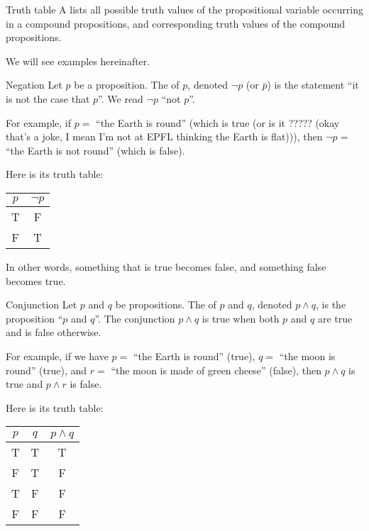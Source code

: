 \documentclass{article}
\begin{document}
\begin{parag}{Truth table}
    A  lists all possible truth values of the propositional variable occurring in a compound propositions, and corresponding truth values of the compound propositions.

    We will see examples hereinafter.
\end{parag}

\begin{parag}{Negation}
    Let $p$ be a proposition. The  of $p$, denoted $\lnot p$ (or $\bar{p}$) is the statement ``it is not the case that $p$''. We read $\lnot p$ ``not $p$''.

    For example, if $p = $ ``the Earth is round'' (which is true (or is it ????? (okay that's a joke, I mean I'm not at EPFL thinking the Earth is flat))), then $\lnot p = $ ``the Earth is not round'' (which is false). 

    Here is its truth table:
    \begin{center}
    \begin{tabular}{c|c}
        $p$ & $\lnot p$  \\
        \hline
        T & F  \\
        F & T
    \end{tabular}
    \end{center}

    In other words, something that is true becomes false, and something false becomes true.
\end{parag}

\begin{parag}{Conjunction}
    Let $p$ and $q$ be propositions. The  of $p$ and $q$, denoted $p \land q$, is the proposition ``$p$ and $q$''. The conjunction $p \land q$ is true when both $p$ and $q$ are true and is false otherwise.

    For example, if we have $p = $ ``the Earth is round'' (true), $q = $ ``the moon is round'' (true), and $r = $ ``the moon is made of green cheese'' (false), then $p \land q$ is true and $p \land r$ is false.

    Here is its truth table:
    \begin{center}
    \begin{tabular}{c|c|c}
        $p$ & $q$ & $p \land q$ \\
        \hline
        T & T & T \\
        F & T & F \\
        T & F & F \\
        F & F & F 
    \end{tabular}
    \end{center}
\end{parag}
\end{document}
